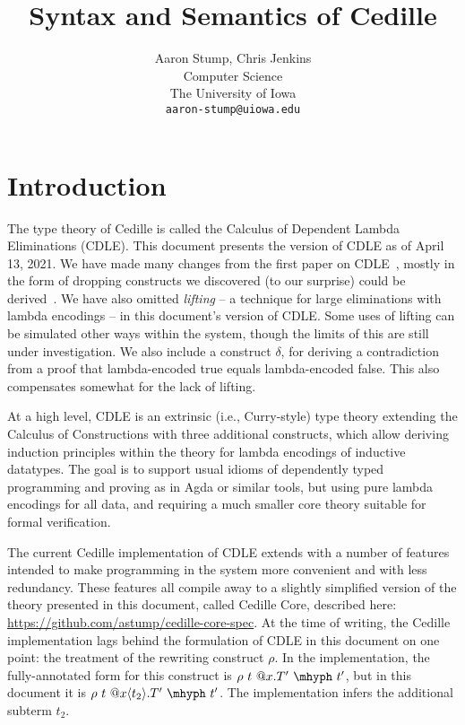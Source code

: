 \documentclass{article}
\begin{document}
\title{Syntax and Semantics of Cedille}

\author{Aaron Stump, Chris Jenkins \\
  Computer Science \\
  The University of Iowa \\
\texttt{aaron-stump@uiowa.edu}}

\date{}

\maketitle

\section{Introduction}

The type theory of Cedille is called the Calculus of Dependent Lambda
Eliminations (CDLE).  This document presents the version of CDLE as of
April 13, 2021.  We have made many changes from the first paper on CDLE~\cite{stump17},
mostly in the form of dropping constructs we discovered (to our
surprise) could be derived~\cite{stump18}. We have also omitted
\emph{lifting} -- a technique for large eliminations with lambda
encodings -- in this document's version of CDLE.  Some uses of lifting
can be simulated other ways within the system, though the limits of
this are still under investigation.  We also include a construct
$\delta$, for deriving a contradiction from a proof that
lambda-encoded true equals lambda-encoded false.  This also
compensates somewhat for the lack of lifting.

At a high level, CDLE is an extrinsic (i.e., Curry-style) type theory
extending the Calculus of Constructions with three additional
constructs, which allow deriving induction principles within the
theory for lambda encodings of inductive datatypes.  The goal is to support
usual idioms of dependently typed programming and proving as in Agda or
similar tools, but using pure lambda encodings for all data, and
requiring a much smaller core theory suitable for formal verification.

The current Cedille implementation of CDLE extends with a number of features
intended to make programming in the system more convenient and with less
redundancy.
These features all compile away to a slightly simplified version of the
theory presented in this document, called Cedille Core, described
here: \url{https://github.com/astump/cedille-core-spec}.
At the time of writing, the Cedille implementation lags behind the formulation
of CDLE in this document on one point: the treatment of the rewriting construct
\(\rho\).
In the implementation, the fully-annotated form for this construct is \(\rho\ t\
@x.T'\ \mhyph\ t'\), but in this document it is \(\rho\ t\ @x\langle
t_2 \rangle.T'\ \mhyph\ t'\).
The implementation infers the additional subterm \(t_2\).
\end{document}
